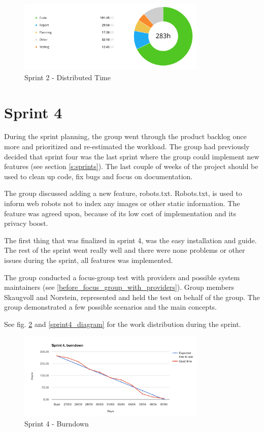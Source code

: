 \begin{figure}[ht]
\centering
    \includegraphics[width=0.8\textwidth]{fig/sprint2-diagram}
\caption{Sprint 2 - Distributed Time}
\label{sprint2_diagram}
\end{figure}

\section{Sprint 4}
\label{Sprints-sprint4}
During the sprint planning, the group went through the product backlog once more and prioritized and re-estimated the workload. The group had previously decided that sprint four was the last sprint where the group could implement new features (see section \ref{s:sprints}). The last couple of weeks of the project should be used to clean up code, fix bugs and focus on documentation. 

The group discussed adding a new feature, robots.txt. Robots.txt, is used to inform web robots not to index any images or other static information. The feature was agreed upon, because of its low cost of implementation and its privacy boost. 

The first thing that was finalized in sprint 4, was the easy installation and guide. The rest of the sprint went really well and there were none problems or other issues during the sprint, all features was implemented.

The group conducted a focus-group test with providers and possible system maintainers (see \ref{before_focus_group_with_providers}). Group members Skaugvoll and Norstein, represented and held the test on behalf of the group. The group demonstrated a few possible scenarios and the main concepts. 

See fig. \ref{sprint4_burndown} and \ref{sprint4_diagram} for the work distribution during the sprint.

\begin{figure}[ht]
\centering
    \includegraphics[width=0.8\textwidth]{fig/sprint4}
\caption{Sprint 4 - Burndown}
\label{sprint4_burndown}
\end{figure}

